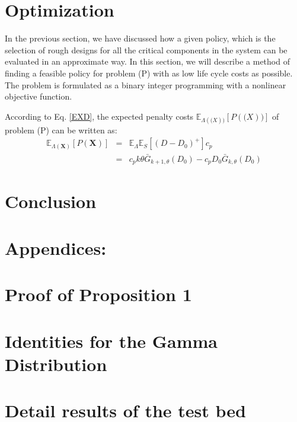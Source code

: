 \documentclass[preprint,12pt]{elsarticle}
\begin{document}
\section{Optimization}

In the previous section, we have discussed how a given policy, which is the selection of rough designs for all the critical components in the system can be evaluated in an approximate way. In this section, we will describe a method of finding a feasible policy for problem (P) with as low life cycle costs as possible. The problem is formulated as a binary integer programming with a nonlinear objective function.

According to Eq. \eqref{EXD}, the expected penalty costs $\mathbb{E}_{\Lambda(\boldsymbol(X))}[P(\boldsymbol(X))]$ of problem (P) can be written as:
\begin{eqnarray}
\mathbb{E}_{\Lambda(\boldsymbol{X})}[P(\boldsymbol{X})]&=&\mathbb{E}_{\Lambda}\mathbb{E}_{S}{[(D-D_{0})^{+}]c_{p}} \nonumber\\
&=&c_{p}k\theta \bar{G}_{k+1,\theta}(D_{0}) -c_{p} D_{0}\bar{G}_{k,\theta}(D_{0})
\end{eqnarray}

\section{Conclusion}
\section{Appendices:}
\appendix
\section{Proof of Proposition 1}
\label{Pro1}
\section{Identities for the Gamma Distribution}
\label{AG}

\section{Detail results of the test bed}
\end{document}
